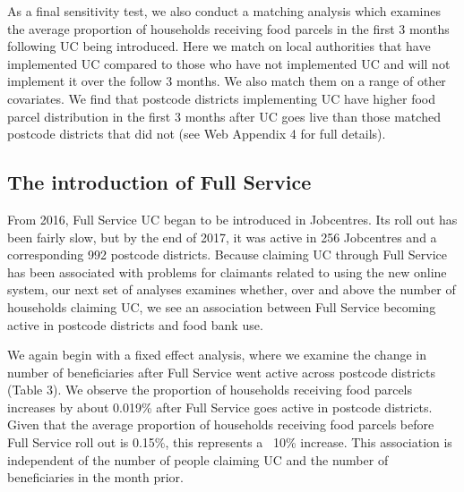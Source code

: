 \documentclass[12pt,article,oneside]{memoir}
\begin{document}
As a final sensitivity test, we also conduct a matching analysis which examines the average proportion of households receiving food parcels in the first 3 months following UC being introduced. Here we match on local authorities that have implemented UC compared to those who have not implemented UC and will not implement it over the follow 3 months. We also match them on a range of other covariates. We find that postcode districts implementing UC have higher food parcel distribution in the first 3 months after UC goes live than those matched postcode districts that did not (see Web Appendix 4 for full details).

\subsection*{The introduction of Full Service}

From 2016, Full Service UC began to be introduced in Jobcentres. Its roll out has been fairly slow, but by the end of 2017, it was active in 256 Jobcentres and a corresponding 992 postcode districts. Because claiming UC through Full Service has been associated with problems for claimants related to using the new online system, our next set of analyses examines whether, over and above the number of households claiming UC, we see an association between Full Service becoming active in postcode districts and food bank use.

We again begin with a fixed effect analysis, where we examine the change in number of beneficiaries after Full Service went active across postcode districts (Table 3). We observe the proportion of households receiving food parcels increases by about 0.019\% after Full Service goes active in postcode districts. Given that the average proportion of households receiving food parcels before Full Service roll out is 0.15\%, this represents a ~10\% increase. This association is independent of the number of people claiming UC and the number of beneficiaries in the month prior. 
\end{document}
